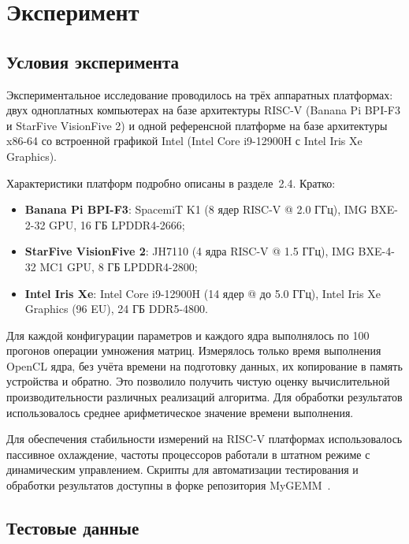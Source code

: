
\section{Эксперимент}

\subsection{Условия эксперимента}

Экспериментальное исследование проводилось на трёх аппаратных платформах: двух одноплатных компьютерах на базе архитектуры RISC-V (Banana Pi BPI-F3 и StarFive VisionFive 2) и одной референсной платформе на базе архитектуры x86-64 со встроенной графикой Intel (Intel Core i9-12900H с Intel Iris Xe Graphics).

Характеристики платформ подробно описаны в разделе~2.4. Кратко:
\begin{itemize}
    \item \textbf{Banana Pi BPI-F3}: SpacemiT K1 (8 ядер RISC-V @ 2.0 ГГц), IMG BXE-2-32 GPU, 16 ГБ LPDDR4-2666;
    \item \textbf{StarFive VisionFive 2}: JH7110 (4 ядра RISC-V @ 1.5 ГГц), IMG BXE-4-32 MC1 GPU, 8 ГБ LPDDR4-2800;
    \item \textbf{Intel Iris Xe}: Intel Core i9-12900H (14 ядер @ до 5.0 ГГц), Intel Iris Xe Graphics (96 EU), 24 ГБ DDR5-4800.
\end{itemize}

Для каждой конфигурации параметров и каждого ядра выполнялось по 100 прогонов операции умножения матриц. Измерялось только время выполнения OpenCL ядра, без учёта времени на подготовку данных, их копирование в память устройства и обратно. Это позволило получить чистую оценку вычислительной производительности различных реализаций алгоритма. Для обработки результатов использовалось среднее арифметическое значение времени выполнения.

Для обеспечения стабильности измерений на RISC-V платформах использовалось пассивное охлаждение, частоты процессоров работали в штатном режиме с динамическим управлением. Скрипты для автоматизации тестирования и обработки результатов доступны в форке репозитория MyGEMM~\cite{mygemm_repo_test}.

\subsection{Тестовые данные}

